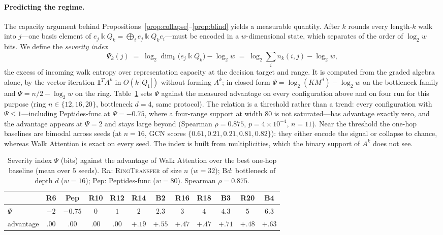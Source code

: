 \documentclass[runningheads]{llncs}
\newcommand{\kk}{\Bbbk}
\newcommand{\kQ}{\kk Q}
\newcommand{\Adj}{A}
\begin{document}
\paragraph{Predicting the regime.}
The capacity argument behind
Propositions~\ref{prop:collapse}--\ref{prop:blind} yields a measurable
quantity. After $k$ rounds every length-$k$ walk into $j$---one basis element
of $e_j\kQ_k=\bigoplus_i e_j\kQ_k e_i$---must be encoded in a $w$-dimensional
state, which separates of the order of $\log_2 w$ bits. We define the
\emph{severity index}
\begin{equation}\label{eq:psi}
  \Psi_k(j)\;=\;\log_2\dim_\kk\bigl(e_j\kQ_k\bigr)-\log_2 w
  \;=\;\log_2\textstyle\sum_i n_k(i,j)-\log_2 w,
\end{equation}
the excess of incoming walk entropy over representation capacity at the
decision target and range. It is computed from the graded algebra alone, by
the vector iteration $\mathbf{1}^{T}\Adj^{k}$ in $O(k\,|Q_1|)$ without forming
$\Adj^{k}$; in closed form $\Psi=\log_2(KM^{d})-\log_2 w$ on the bottleneck
family and $\Psi=n/2-\log_2 w$ on the ring. Table~\ref{tab:severity} sets
$\Psi$ against the measured advantage on every configuration above and on four
run for this purpose (ring $n\in\{12,16,20\}$, bottleneck $d{=}4$, same
protocol). The relation is a threshold rather than a trend: every
configuration with $\Psi\le1$---including Peptides-func at $\Psi=-0.75$, where
a four-range support at width $80$ is not saturated---has advantage exactly
zero, and the advantage appears at $\Psi=2$ and stays large beyond (Spearman
$\rho=0.875$, $p=4\times10^{-4}$, $n=11$). Near the threshold the one-hop
baselines are bimodal across seeds (at $n{=}16$, GCN scores
$\{0.61,0.21,0.21,0.81,0.82\}$): they either encode the signal or collapse to
chance, whereas Walk Attention is exact on every seed. The index is built from
multiplicities, which the binary support of $\Adj^{k}$ does not see.

\begin{table}[t]
\centering
\caption{Severity index $\Psi$ (bits) against the advantage of Walk Attention
over the best one-hop baseline (mean over $5$ seeds). R$n$: \textsc{RingTransfer}
of size $n$ ($w{=}32$); B$d$: bottleneck of depth $d$ ($w{=}16$); Pep:
Peptides-func ($w{=}80$). Spearman $\rho=0.875$.}
\label{tab:severity}
\setlength{\tabcolsep}{3.2pt}\footnotesize
\begin{tabular}{l*{11}{c}}
\toprule
 & R6 & Pep & R10 & R12 & R14 & B2 & R16 & R18 & B3 & R20 & B4\\
\midrule
$\Psi$ & $-2$ & $-0.75$ & $0$ & $1$ & $2$ & $2.3$ & $3$ & $4$ & $4.3$ & $5$ & $6.3$\\
advantage & $.00$ & $.00$ & $.00$ & $.00$ & $+.19$ & $+.55$ & $+.47$ & $+.47$ & $+.71$ & $+.48$ & $+.63$\\
\bottomrule
\end{tabular}
\end{table}
\end{document}
